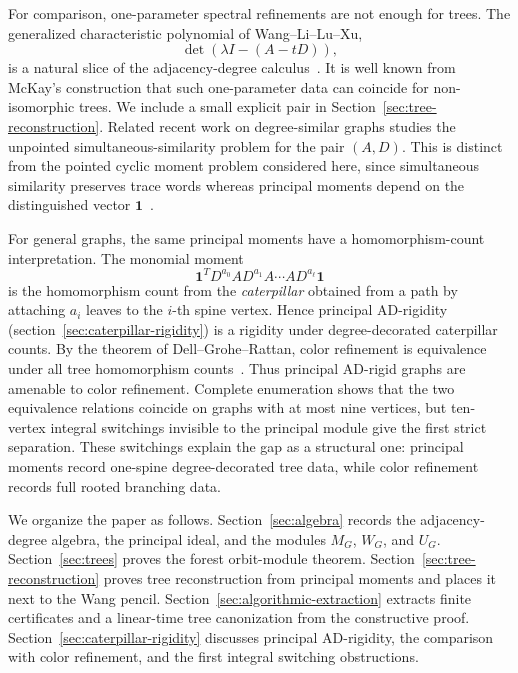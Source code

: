 \documentclass[a4paper,fleqn]{cas-sc}
\theoremstyle{definition}
\theoremstyle{remark}
\newcommand{\one}{\mathbf 1}
\begin{document}
For comparison, one-parameter spectral refinements are not enough for trees. The
generalized characteristic polynomial of Wang--Li--Lu--Xu,
\[\det(\lambda I-(A-tD)),\]
is a natural slice of the adjacency-degree calculus~\citep{WangLiLuXu2011}.  It is
well known from McKay's construction that such one-parameter data can coincide
for non-isomorphic trees.  We include a small explicit pair in
Section~\ref{sec:tree-reconstruction}.  Related recent work on degree-similar
graphs studies the unpointed simultaneous-similarity problem for the pair
$(A,D)$. This is distinct from the pointed cyclic moment problem considered
here, since simultaneous similarity preserves trace words whereas principal
moments depend on the distinguished vector $\one$~\citep{GodsilSun2025DegreeSimilar,FanXingZhangWang2025DegreeSimilar}.

For general graphs, the same principal moments have a homomorphism-count
interpretation.  The monomial moment
\[
        \mathbf1^TD^{a_0}AD^{a_1}A\cdots AD^{a_\ell}\mathbf1
\]
is the homomorphism count from the \emph{caterpillar} obtained from a path by attaching
$a_i$ leaves to the $i$-th spine vertex.  Hence principal AD-rigidity (section~\ref{sec:caterpillar-rigidity}) is a rigidity
under degree-decorated caterpillar counts.  By the theorem of Dell--Grohe--Rattan,
color refinement is equivalence under all tree homomorphism counts~\citep{DellGroheRattan2018}.
Thus principal AD-rigid graphs are amenable to color refinement. Complete
enumeration shows that the two equivalence relations coincide on graphs with at
most nine vertices, but ten-vertex integral switchings invisible to the
principal module give the first strict separation. These switchings explain the
gap as a structural one: principal moments record one-spine degree-decorated tree
data, while color refinement records full rooted branching data.

We organize the paper as follows.  Section~\ref{sec:algebra} records the
adjacency-degree algebra, the principal ideal, and the modules $M_G$, $W_G$, and
$U_G$.  Section~\ref{sec:trees} proves the forest orbit-module theorem.
Section~\ref{sec:tree-reconstruction} proves tree reconstruction from principal
moments and places it next to the Wang pencil.  Section~\ref{sec:algorithmic-extraction}
extracts finite certificates and a linear-time tree canonization from the
constructive proof.  Section~\ref{sec:caterpillar-rigidity} discusses principal
AD-rigidity, the comparison with color refinement, and the first integral
switching obstructions.
\end{document}
